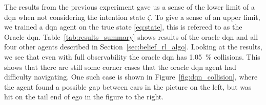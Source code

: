
The results from the previous experiment gave us a sense of the lower limit of a \gls{dqn} when not considering the intention state $\zeta$. To give a sense of an upper limit, we trained a \gls{dqn} agent on the true state \eqref{eq:state}, this is refereed to as the Oracle \gls{dqn}. 
Table~\ref{tab:results_summary} shows results of the oracle \gls{dqn} and all four other agents described in Section~\ref{sec:belief_rl_algo}. 
Looking at the results, we see that even with full observability the oracle \gls{dqn} has \SI{1.05}{\percent} collisions. This shows that there are still some corner cases that the oracle \gls{dqn} agent had difficulty navigating. One such case is shown in Figure~\ref{fig:dqn_collision}, where the agent found a possible gap between cars in the picture on the left, but was hit on the tail end of ego in the figure to the right. 

